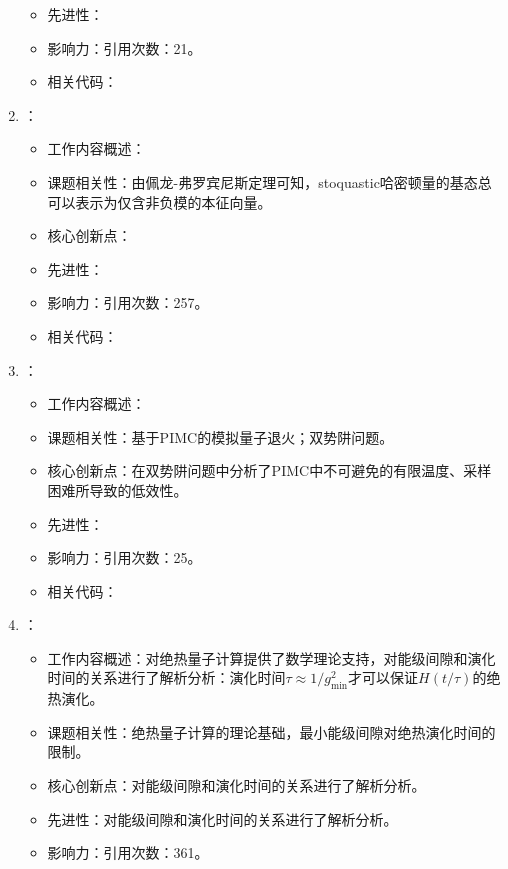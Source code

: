 \begin{enumerate}
\begin{itemize}
                \item 先进性：
                \item 影响力：引用次数：21。
                \item 相关代码：
            \end{itemize}
            \item \citet{bravyi2006complexity}：
            \begin{itemize}
                \item 工作内容概述：
                \item 课题相关性：由佩龙-弗罗宾尼斯定理可知，stoquastic哈密顿量的基态总可以表示为仅含非负模的本征向量。
                \item 核心创新点：
                \item 先进性：
                \item 影响力：引用次数：257。
                \item 相关代码：
            \end{itemize}
            \item \citet{stella2006monte}：
            \begin{itemize}
                \item 工作内容概述：
                \item 课题相关性：基于PIMC的模拟量子退火；双势阱问题。
                \item 核心创新点：在双势阱问题中分析了PIMC中不可避免的有限温度、采样困难所导致的低效性。
                \item 先进性：
                \item 影响力：引用次数：25。
                \item 相关代码：
            \end{itemize}
            \item \citet{jansen2007bounds}：
            \begin{itemize}
                \item 工作内容概述：对绝热量子计算提供了数学理论支持，对能级间隙和演化时间的关系进行了解析分析：演化时间$\tau\approx 1/g_{\text{min}}^2$才可以保证$H(t/\tau)$的绝热演化。
                \item 课题相关性：绝热量子计算的理论基础，最小能级间隙对绝热演化时间的限制。
                \item 核心创新点：对能级间隙和演化时间的关系进行了解析分析。
                \item 先进性：对能级间隙和演化时间的关系进行了解析分析。
                \item 影响力：引用次数：361。

\end{itemize}
\end{enumerate}
